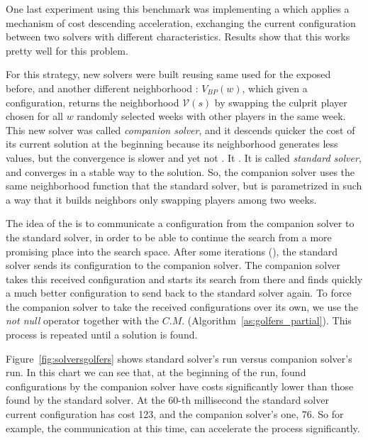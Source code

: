 \separation

One last experiment using this benchmark was implementing a \commstr{} which applies a mechanism of cost descending acceleration, exchanging the current configuration between two solvers with different characteristics. Results show that this \commstr{} works pretty well for this problem.

For this strategy, new solvers were built reusing same \ms{} used for the \commstrs{} exposed before, and another different neighborhood \om{}: $V_{BP}(w)$, which given a configuration, returns the neighborhood $\mathcal{V}\left(s\right)$ by swapping the culprit player chosen for all $w$ randomly selected weeks with other players in the same week. This new solver was called \textit{companion solver}, and it descends quicker the cost of its current solution at the beginning because its neighborhood generates less values, but the convergence is slower and yet not . It . It is called \textit{standard solver}, and converges in a stable way to the solution. So, the companion solver uses the same neighborhood function that the standard solver, but is parametrized in such a way that it builds neighbors only swapping players among two weeks.

The idea of the \commstr{} is to communicate a configuration from the companion solver to the standard solver, in order to be able to continue the search from a more promising place into the search space. After some iterations (), the standard solver sends its configuration to the companion solver. The companion solver takes this received configuration and starts its search from there and finds quickly a much better configuration to send back to the standard solver again. To force the companion solver to take the received configurations over its own, we use the \textit{not null} operator together with the \opch{} $C.M.$ (Algorithm~\ref{as:golfers_partial}). This process is repeated until a solution is found.

Figure~\ref{fig:solversgolfers} shows  standard solver's run versus  companion solver's run. In this chart we can see that, at the beginning of the run, found configurations by the companion solver have costs significantly lower than those found by the standard solver. At the 60-th millisecond the standard solver current configuration has cost 123, and the companion solver's one, 76. So for example, the communication at this time, can accelerate the process significantly.

